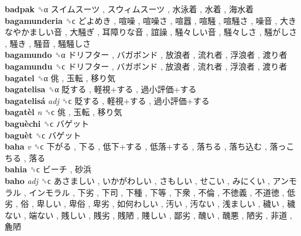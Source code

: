 \textbf{badpak} ␝α   スイムスーツ ,  スウィムスーツ ,  水泳着 ,  水着 ,  海水着   \\
\textbf{bagamunderia} ␝ϲ   どよめき ,  喧噪 ,  喧噪さ ,  喧囂 ,  喧騒 ,  喧騒さ ,  噪音 ,  大きなやかましい音 ,  大騒ぎ ,  耳障りな音 ,  誼譟 ,  騒々しい音 ,  騒々しさ ,  騒がしさ ,  騒き ,  騒音 ,  騒騒しさ   \\
\textbf{bagamundo} ␝α   ドリフター ,  バガボンド ,  放浪者 ,  流れ者 ,  浮浪者 ,  渡り者   \\
\textbf{bagamundu} ␝ϲ   ドリフター ,  バガボンド ,  放浪者 ,  流れ者 ,  浮浪者 ,  渡り者   \\
\textbf{bagatel} ␝α   佻 ,  玉転 ,  移り気   \\
\textbf{bagatelisa} ␝α   貶する ,  軽視+する ,  過小評価+する   \\
\textbf{bagatelisá} \emph{adj}  ␝ϲ   貶する ,  軽視+する ,  過小評価+する   \\
\textbf{bagatèl} \emph{n}  ␝ϲ   佻 ,  玉転 ,  移り気   \\
\textbf{baguèchi} ␝ϲ   バゲット   \\
\textbf{baguèt} ␝ϲ   バゲット   \\
\textbf{baha} \emph{v}  ␝ϲ   下がる ,  下る ,  低下+する ,  低落+する ,  落ちる ,  落ち込む ,  落っこちる ,  落る   \\
\textbf{bahia} ␝ϲ   ビーチ ,  砂浜   \\
\textbf{baho} \emph{adj}  ␝ϲ   あさましい ,  いかがわしい ,  さもしい ,  せこい ,  みにくい ,  アンモラル ,  インモラル ,  下劣 ,  下司 ,  下種 ,  下等 ,  下衆 ,  不倫 ,  不徳義 ,  不道徳 ,  低劣 ,  俗 ,  卑しい ,  卑俗 ,  卑劣 ,  如何わしい ,  汚い ,  汚ない ,  浅ましい ,  穢い ,  穢ない ,  端ない ,  賎しい ,  賎劣 ,  賎陋 ,  賤しい ,  鄙劣 ,  醜い ,  醜悪 ,  陋劣 ,  非道 ,  麁陋   \\
